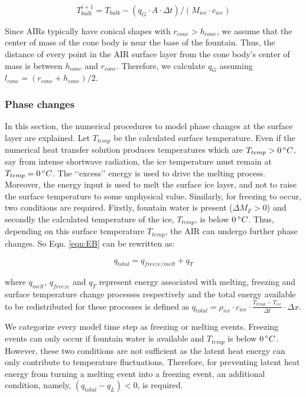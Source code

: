 \documentclass[utf8]{frontiersSCNS}
\begin{document}
\begin{equation} T_{bulk}^{i+1} = T_{bulk} - (q_{G} \cdot A \cdot \Delta t)/(M_{ice} \cdot c_{ice}) \end{equation}

Since AIRs typically have conical shapes with $r_{cone} > h_{cone}$, we assume that the center of mass of the cone
body is near the base of the fountain. Thus, the distance of every point in the AIR surface layer from the cone
body's center of mass is between $h_{cone}$ and $r_{cone}$. Therefore, we calculate $q_{G}$ assuming $l_{cone} = (r_{cone} +
	h_{cone})/2$.

\subsubsection{Phase changes}

In this section, the numerical procedures to model phase changes at the surface layer are explained. Let
$T_{temp}$ be the calculated surface temperature. Even if the numerical heat transfer solution produces
temperatures which are $T_{temp}>0\, \degree C$, say from intense shortwave radiation, the ice temperature must
remain at $T_{temp} = 0\, \degree C$. The ‘‘excess’’ energy is used to drive the melting process. Moreover, the
energy input is used to melt the surface ice layer, and not to raise the surface temperature to some unphysical
value. Similarly, for freezing to occur, two conditions are required. Firstly, fountain water is present
($\Delta M_{F} > 0 $) and secondly the calculated temperature of the ice, $T_{temp}$, is below $0\, \degree C$.
Thus, depending on this surface temperature $T_{temp}$, the AIR can undergo further phase changes. So Eqn.
\ref{eqn:EB} can be rewritten as:

\begin{equation}
	q_{total}= q_{freeze/melt} + q_{T}
\end{equation}

where $q_{melt}$, $q_{freeze}$ and $q_{T}$ represent energy associated with melting, freezing and surface
temperature change processes respectively and the total energy available to be redistributed for these processes
is defined as $q_{total}=\rho_{ice} \cdot c_{ice} \cdot \frac{T_{temp}-T_{ice}}{\Delta t} \cdot \Delta x$.

We categorize every model time step as freezing or melting events. Freezing events can only occur if fountain
water is available and $T_{temp}$ is below $0\,\degree C$. However, these two conditions are not sufficient as
the latent heat energy can only contribute to temperature fluctuations. Therefore, for preventing latent heat
energy from turning a melting event into a freezing event, an additional condition, namely, $(q_{total}-q_{L}) <
0$, is required.
\end{document}
